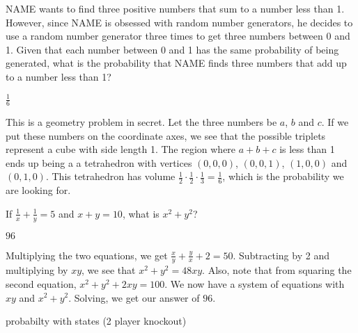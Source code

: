 \documentclass[11pt]{article}
\begin{document}
\begin{problem} %
NAME wants to find three positive numbers that sum to a number less than 1. However, since NAME is obsessed with random number generators, he decides to use a random number generator three times to get three numbers between 0 and 1. Given that each number between 0 and 1 has the same probability of being generated, what is the probability that NAME finds three numbers that add up to a number less than 1?
\end{problem}

\begin{answer}
$\frac{1}{6}$
\end{answer}

\begin{solution}
This is a geometry problem in secret. Let the three numbers be $a$, $b$ and $c$. If we put these numbers on the coordinate axes, we see that the possible triplets represent a cube with side length 1. The region where $a + b + c$ is less than 1 ends up being a a tetrahedron with vertices $(0, 0, 0)$, $(0, 0, 1)$, $(1, 0, 0)$ and $(0, 1, 0)$. This tetrahedron has volume $\frac{1}{2} \cdot \frac{1}{2} \cdot \frac{1}{3} = \frac{1}{6}$, which is the probability we are looking for.
\end{solution}


\begin{problem}%
If $\frac{1}{x} + \frac{1}{y} = 5$ and $x+y=10$, what is $x^2+y^2$?
\end{problem}

\begin{answer}
$\boxed{96}$
\end{answer}

\begin{solution}
Multiplying the two equations, we get $\frac{x}{y} + \frac{y}{x} + 2 = 50$. Subtracting by 2 and multiplying by $xy$, we see that $x^2+y^2 = 48xy$. Also, note that from squaring the second equation, $x^2+ y^2 +2xy = 100$. We now have a system of equations with $xy$ and $x^2+y^2$. Solving, we get our answer of $\boxed{96}$.
\end{solution}


\begin{problem}
probabilty with states (2 player knockout)
\end{problem}

\begin{answer}

\end{answer}
\end{document}

